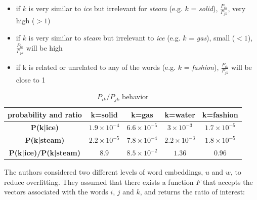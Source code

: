 \begin{itemize}
    \item  if $k$ is very similar to \textit{ice} but irrelevant for \textit{steam} (e.g. $k$ = \textit{solid}),  $\frac{P_{ik}}{P_{jk}}$, very high ($>1$)
    \item if $k$ is very similar to \textit{steam} but irrelevant to \textit{ice} (e.g. $k$ = \textit{gas}), small ($<1$), $\frac{P_{ik}}{P_{jk}}$ will be high
    \item if k is related or unrelated to any of the words (e.g. $k$ = \textit{fashion}), $\frac{P_{ik}}{P_{jk}}$ will be close to 1
\end{itemize}


\begin{table}[h]
\centering
\begin{tabular}{|c|cccc|}
\hline
probability and ratio & \textbf{k=solid} & \textbf{k=gas} & \textbf{k=water} & \textbf{k=fashion} \\ \hline
\textbf{P(k|ice)} & $1.9 \times 10^{-4}$ & $6.6 \times 10^{-5}$ & $3 \times 10^{-3}$ & $1.7 \times 10^{-5}$ \\
\textbf{P(k|steam)} & $2.2 \times 10^{-5}$ & $7.8 \times 10^{-4}$ & $2.2 \times 10^{-3}$ & $1.8 \times 10^{-5}$ \\
\textbf{P(k|ice)/P(k|steam)} & $8.9$ & $8.5 \times 10^{-2}$ & $1.36$ & $0.96$ \\ \hline
\end{tabular}
\caption{$P_{ik}/P_{jk}$ behavior}
\label{tab:g3}
\end{table}



The authors considered two different levels of word embeddings, $u$ and $w$, to reduce overfitting. They assumed that there exists a function $F$ that accepts the vectors associated with the words $i$, $j$ and $k$, and returns the ratio of interest:

